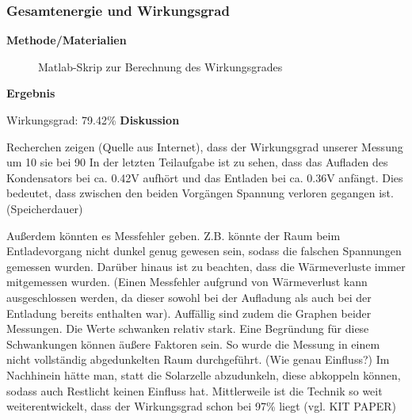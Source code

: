     \subsubsection{Gesamtenergie und Wirkungsgrad}                      %
        \textbf{Methode/Materialien}
        \newline
        \par
        \begin{figure}[H]
            
            \caption{Matlab-Skrip zur Berechnung des Wirkungsgrades}
        \end{figure}
        \vspace{4mm}
        \textbf{Ergebnis}
        \newline
        \par Wirkungsgrad: 79.42\%
        \vspace{4mm}
        \newline
        \textbf{Diskussion}
        \newline
        \par Recherchen zeigen (Quelle aus Internet), dass der Wirkungsgrad unserer Messung um 10 %
        sie bei 90%
        In der letzten Teilaufgabe ist zu sehen, dass das Aufladen des Kondensators bei ca. 0.42V aufhört und
        das Entladen bei ca. 0.36V anfängt. Dies bedeutet, dass zwischen den beiden Vorgängen Spannung
        verloren gegangen ist. (Speicherdauer)
        \par Außerdem könnten es Messfehler geben. Z.B. könnte der Raum beim Entladevorgang nicht dunkel
        genug gewesen sein, sodass die falschen Spannungen gemessen wurden. Darüber hinaus ist zu beachten, dass die Wärmeverluste immer mitgemessen wurden. (Einen Messfehler aufgrund von Wärmeverlust kann ausgeschlossen werden, da dieser sowohl bei der Aufladung als auch bei der Entladung bereits enthalten war).
        Auffällig sind zudem die Graphen beider Messungen. Die Werte schwanken relativ stark. Eine Begründung für diese Schwankungen können äußere Faktoren sein. So wurde die Messung in einem nicht vollständig abgedunkelten Raum durchgeführt. (Wie genau Einfluss?) Im Nachhinein hätte man, statt die Solarzelle abzudunkeln, diese abkoppeln können, sodass auch Restlicht keinen Einfluss hat. 
        Mittlerweile ist die Technik so weit weiterentwickelt, dass der Wirkungsgrad schon bei 97\% liegt (vgl. KIT PAPER) 
